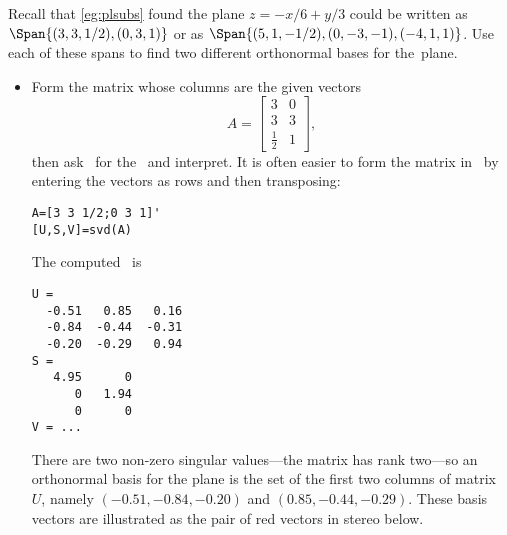 \begin{example} \label{eg:orthospan}
Recall that \autoref{eg:plsubs} found the plane \(z=-x/6+y/3\) could be written as \(\Span\{(3,3,1/2),(0,3,1)\}\) or as \(\Span\{(5,1,-1/2),(0,-3,-1),(-4,1,1)\}\).
Use each of these spans to find two different orthonormal bases for the~plane.
\begin{solution} 
\begin{itemize}
\item Form the matrix whose columns are the given vectors
\begin{equation*}
A=\begin{bmatrix} 3&0\\3&3\\\frac12&1 \end{bmatrix},
\end{equation*}
then ask \script\ for the \svd\ and interpret.
It is often easier to form the matrix in \script\ by entering the vectors as rows and then transposing:
\begin{verbatim}
A=[3 3 1/2;0 3 1]'
[U,S,V]=svd(A)
\end{verbatim}
\setbox\ajrqrbox\hbox{}%
\marginpar{\usebox{\ajrqrbox}}%
The computed \svd\ is \twodp
\begin{verbatim}
U =
  -0.51   0.85   0.16
  -0.84  -0.44  -0.31
  -0.20  -0.29   0.94
S =
   4.95      0
      0   1.94
      0      0
V = ...
\end{verbatim}
There are two non-zero singular values---the matrix has rank two---so an orthonormal basis for the plane is the set of the first two columns of matrix~\(U\), namely  \((-0.51,-0.84,-0.20)\) and \((0.85,-0.44,-0.29)\).
These basis vectors are illustrated as the pair of red vectors in stereo below.
\begin{center}
 {}%
\end{center}


\end{itemize}
\end{solution}
\end{example}
